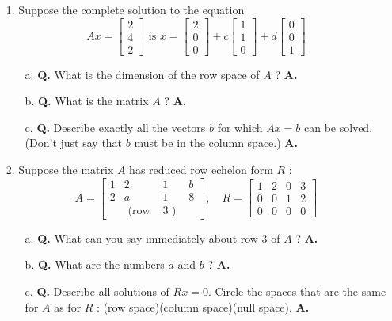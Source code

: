 \documentclass[main.tex]{subfiles}
\begin{document}
\begin{enumerate}
\item [1.] Suppose the complete solution to the equation
$$
A x=\left[\begin{array}{l}
2 \\
4 \\
2
\end{array}\right] \text { is } x=\left[\begin{array}{l}
2 \\
0 \\
0
\end{array}\right]+c\left[\begin{array}{l}
1 \\
1 \\
0
\end{array}\right]+d\left[\begin{array}{l}
0 \\
0 \\
1
\end{array}\right]
$$
\begin{enumerate}
    \item [a.] \textbf{Q.} What is the dimension of the row space of $A$ ? \textbf{A.}
    \item [b.] \textbf{Q.} What is the matrix $A$ ? \textbf{A.}
    \item [c.] \textbf{Q.} Describe exactly all the vectors $b$ for which $A x=b$ can be solved. (Don't just say that $b$ must be in the column space.) \textbf{A.}
\end{enumerate}

\item [2.] Suppose the matrix $A$ has reduced row echelon form $R$ :
$$
A=\left[\begin{array}{cccc}
1 & 2 & 1 & b \\
2 & a & 1 & 8 \\
& \text { (row } & 3 \text { ) }
\end{array}\right], \quad R=\left[\begin{array}{llll}
1 & 2 & 0 & 3 \\
0 & 0 & 1 & 2 \\
0 & 0 & 0 & 0
\end{array}\right]
$$
\begin{enumerate}
    \item [a.] \textbf{Q.} What can you say immediately about row 3 of $A$ ? \textbf{A.}
    \item [b.] \textbf{Q.} What are the numbers $a$ and $b$ ? \textbf{A.}
    \item [c.] \textbf{Q.} Describe all solutions of $R x=0$. Circle the spaces that are the same for $A$ as for $R$ : (row space)(column space)(null space). \textbf{A.}
\end{enumerate}


\end{enumerate}
\end{document}
